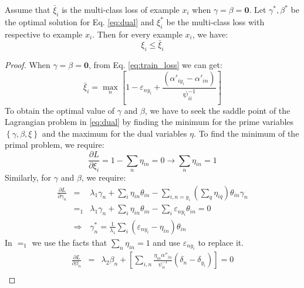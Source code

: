 \begin{theorem}\label{th:supb}
Assume that $\bar \xi_i$ is the multi-class loss of example $x_i$ when $\gamma=\beta = \mathbf{0}$. Let $\gamma^*, \beta^*$ be the optimal solution for Eq. \eqref{eq:dual} and $\xi_i^*$ be the multi-class loss with respective to example $x_i$. Then for every example $x_i$, we have:\[\xi_i \le \bar \xi_i\]
\end{theorem}
\begin{proof}
When $\gamma=\beta = \mathbf{0}$, from Eq. \eqref{eq:train_loss} we can get:
\begin{equation*}
{\bar \xi _i} = \mathop {\max }\limits_n \left[ {1 - {\varepsilon _{n{y_i}}} + \frac{{\left( {{{\alpha '}_{i{y_i}}} - {{\alpha '}_{in}}} \right)}}{{\psi _{ii}^{ - 1}}}} \right]
\end{equation*}
To obtain the optimal value of $\gamma$ and $\beta$, we have to seek the saddle point of the Lagrangian problem in \eqref{eq:dual} by finding the minimum for the prime variables $\left\{ \gamma, \beta, \xi \right\}$ and the maximum for the dual variables $\eta $. To find the minimum of the primal problem, we require:
\begin{equation*}
\frac{{\partial L}}{{\partial {\xi _i}}} = 1 - \sum\limits_n {{\eta _{in}}}  = 0 \to \sum\limits_n {{\eta _{in}}}  = 1
\end{equation*}   
Similarly, for $\gamma$ and $\beta$, we require:
\begin{eqnarray}
\frac{{\partial L}}{{\partial {\gamma _n}}} &=& {\lambda _1}{\gamma _n} + \sum\limits_i {{\eta _{in}}{\theta _{in}}}  - \sum\limits_{i,n = {y_i}} {\left( {\sum\limits_q {{\eta _{iq}}} } \right){\theta _{in}}{\gamma _n}}  \nonumber\\
&=_1 &{\lambda _1}{\gamma _n} + \sum\limits_i {{\eta _{in}}{\theta _{in}}}  - \sum\limits_i {{\varepsilon _{n{y_i}}}{\theta _{in}}}  = 0  \nonumber\\
&\Rightarrow & \gamma _n^* = \frac{1}{{{\lambda _1}}}\sum\limits_i {\left( {{\varepsilon _{n{y_i}}} - {\eta _{in}}} \right){\theta _{in}}} 
\end{eqnarray}
In $=_1$ we use the facts that $\sum_n\eta_{in}=1$ and use $\varepsilon_{ny_i}$ to replace it.
\begin{eqnarray}
\frac{{\partial L}}{{\partial {\beta _n}}} &=& {\lambda _2}{\beta _n} + \left[ {\sum\limits_{i,n} {\frac{{{\eta _{in}}{{\alpha ''}_{in}}}}{{\psi_{ii}^{ - 1}}}\left( {{\delta _n} - {\delta _{{y_i}}}} \right)} } \right] = 0 \nonumber \\

\end{eqnarray}
\end{proof}
